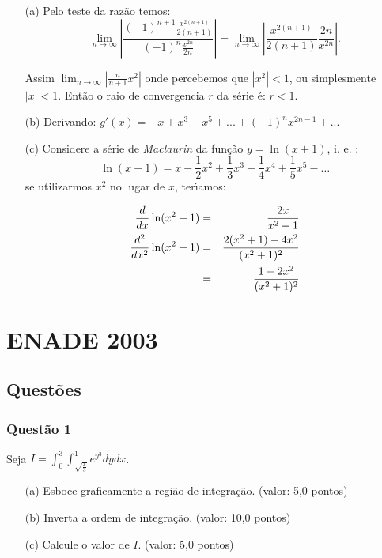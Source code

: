 \documentclass{report}
\begin{document}
\begin{enumerate}

\item[(a)] Pelo teste da raz\~ao temos: $$\lim_{n\to\infty}\left|\frac{(-1)^{n+1}\displaystyle \frac{x^{2(n+1)}}{2(n+1)}}{(-1)^n\displaystyle \frac{x^{2n}}{2n}}\right|=\lim_{n\to\infty}\left|\frac{x^{2(n+1)}}{2(n+1)}\frac{2n}{x^{2n}}\right|.$$

Assim $\lim_{n\to\infty} \left|\frac{n}{n+1}x^2\right|$ onde percebemos que $|x^2|<1$, ou simplesmente $|x|<1$. Ent\~ao o raio de convergencia $r$ da s\'erie \'e: $r<1$.

\item[(b)] Derivando: $g'(x)=\displaystyle -x+x^3-x^5+...+(-1)^n x^{2n-1}+...$

\item[(c)] Considere a s\'erie de {\it Maclaurin} da fun\c c\~ao $y=\ln(x+1)$, i. e. : $$\ln(x+1)=x - \frac1{2} x^2 + \frac1{3}x^3 - \frac1{4}x^4 + \frac1{5}x^5-\ldots$$ se utilizarmos $x^2$ no lugar de $x$, ter\'\i amos:

\begin{eqnarray*}
{d\over dx}\ln(x^2+1)&=&{2x\over x^2+1}\\
{d^2\over dx^2}\ln(x^2+1)&=&{2(x^2+1)-4x^2\over(x^2+1)^2}\\
&=&{1-2x^2\over(x^2+1)^2}
\end{eqnarray*}

\end{enumerate}

\chapter{ENADE 2003}

\section{\color{blue} Quest\~oes}

\subsection{\color{blue} Quest\~ao 1}

Seja $I =\displaystyle \int_0 ^3\int_{\sqrt{\frac{x}{3}}}^1 e^{y^3} dydx$.

\begin{enumerate}

\item[(a)] Esboce graficamente a regi\~ao de integra\c c\~ao. (valor: 5,0 pontos)

\item[(b)] Inverta a ordem de integra\c c\~ao. (valor: 10,0 pontos)

\item[(c)] Calcule o valor de $I$. (valor: 5,0 pontos)

\end{enumerate}
\end{document}

